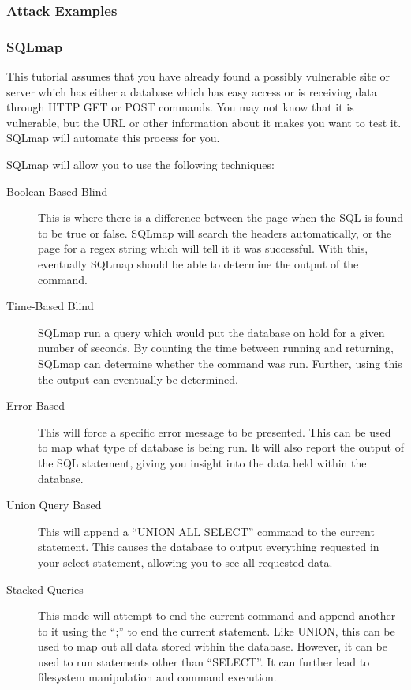 		\subsubsection{Attack Examples}
			
		\subsubsection{SQLmap}
			This tutorial assumes that you have already found a possibly vulnerable site or server which has either a database which has easy access or is receiving data through HTTP GET or POST commands. 
			You may not know that it is vulnerable, but the URL or other information about it makes you want to test it. 
			SQLmap will automate this process for you. 

			SQLmap will allow you to use the following techniques:
			\begin{description}
				\item[Boolean-Based Blind] This is where there is a difference between the page when the SQL is found to be true or false. 
					SQLmap will search the headers automatically, or the page for a regex string which will tell it it was successful. 
					With this, eventually SQLmap should be able to determine the output of the command. 
				\item[Time-Based Blind] SQLmap run a query which would put the database on hold for a given number of seconds. 
					By counting the time between running and returning, SQLmap can determine whether the command was run. 
					Further, using this the output can eventually be determined. 
				\item[Error-Based] This will force a specific error message to be presented. 
					This can be used to map what type of database is being run. 
					It will also report the output of the SQL statement, giving you insight into the data held within the database. 
				\item[Union Query Based] This will append a ``UNION ALL SELECT'' command to the current statement. 
					This causes the database to output everything requested in your select statement, allowing you to see all requested data. 
				\item[Stacked Queries] This mode will attempt to end the current command and append another to it using the ``;'' to end the current statement. 
					Like UNION, this can be used to map out all data stored within the database. 
					However, it can be used to run statements other than ``SELECT''. 
					It can further lead to filesystem manipulation and command execution. 
			\end{description}
